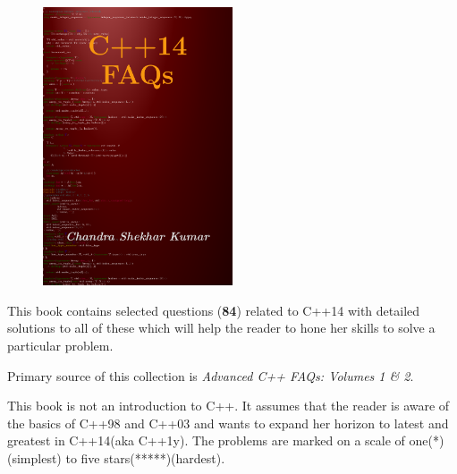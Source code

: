 
\begin{figure}
  \begin{center}
    \includegraphics[width=0.5\textwidth]{cpp14faqs/cover}
  \end{center}
\end{figure}

This book contains selected questions (\textbf{84}) related to C++14 with detailed solutions to all of these which will help the reader to hone her skills to solve a particular problem.

Primary source of this collection is \emph{Advanced C++ FAQs: Volumes 1 \& 2}.

This book is not an introduction to C++. It assumes that the reader is aware of the basics of C++98 and C++03 and wants to expand her horizon to latest and greatest in C++14(aka C++1y). The problems are marked on a scale of one(*)(simplest) to five stars(*****)(hardest).

\hrulefill

